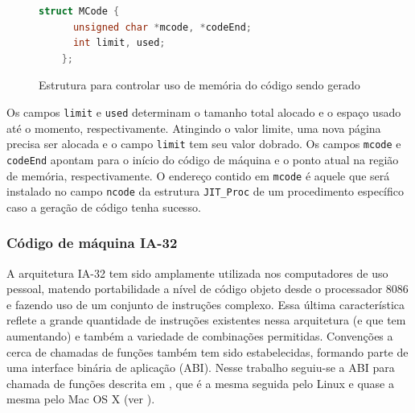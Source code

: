 \begin{figure}[h]
  \centering
  \begin{lstlisting}[language=C]
    struct MCode {
      unsigned char *mcode, *codeEnd;
      int limit, used;
    };
  \end{lstlisting}
  \caption{Estrutura para controlar uso de memória do código sendo gerado\label{mcode-struct}}
\end{figure}

Os campos \verb!limit! e \verb!used! determinam o tamanho total
alocado e o espaço usado até o momento, respectivamente. Atingindo o
valor limite, uma nova página precisa ser alocada e o campo
\verb!limit! tem seu valor dobrado. Os campos \verb!mcode! e
\verb!codeEnd! apontam para o início do código de máquina e o
ponto atual na região de memória, respectivamente. O endereço contido em
\verb!mcode! é aquele que será instalado no campo
\verb!ncode! da estrutura \verb!JIT_Proc! de um procedimento
específico caso a geração de código tenha sucesso.

\subsubsection{Código de máquina IA-32}

A arquitetura IA-32 tem sido amplamente utilizada nos computadores de
uso pessoal, matendo portabilidade a nível de código objeto desde o
processador 8086 e fazendo uso de um conjunto de instruções complexo.
Essa última característica reflete a grande quantidade de instruções
existentes nessa arquitetura (e que tem aumentando) e também a
variedade de combinações permitidas. Convenções a cerca de chamadas de
funções também tem sido estabelecidas, formando parte de uma interface
binária de aplicação (ABI). Nesse trabalho seguiu-se a ABI para
chamada de funções descrita em , que é a mesma
seguida pelo Linux e quase a mesma pelo Mac OS X (ver \cite{macosx-abi}).


